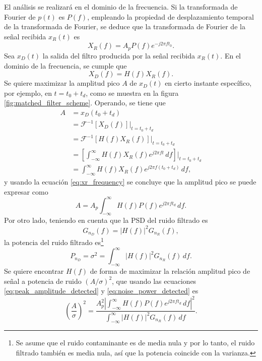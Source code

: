 \documentclass[a4paper]{article}
\begin{document}
El análisis se realizará en el dominio de la frecuencia. Si la transformada de Fourier de \(p(t)\) es \(P(f)\), empleando la propiedad de desplazamiento temporal de la transformada de Fourier, se deduce que la transformada de Fourier de la señal recibida \(x_R(t)\) es
\begin{equation}\label{eq:xr_frequency}
 X_R(f)=A_pP(f)e^{-j2\pi ft_0}.
\end{equation}
Sea \(x_D(t)\) la salida del filtro producida por la señal recibida \(x_R(t)\). En el dominio de la frecuencia, se cumple que
\[
 X_D(f)=H(f)X_R(f).
\]
Se quiere maximizar la amplitud pico \(A\) de \(x_D(t)\) en cierto instante específico, por ejemplo, en \(t=t_0+t_d\), como se muestra en la figura \ref{fig:matched_filter_scheme}. Operando, se tiene que
\begin{align*}
 A &= x_D(t_0+t_d)\\
    &=\mathcal{F}^{-1}\left[X_D(f)\right]\Big|_{t=t_0+t_d}\\
    &=\mathcal{F}^{-1}\left[H(f)X_R(f)\right]\Big|_{t=t_0+t_d}\\
    &=\left[\int_{-\infty}^{\infty}H(f)X_R(f)e^{j2\pi ft}\,df\right]\bigg|_{t=t_0+t_d}\\
    &=\int_{-\infty}^{\infty}H(f)X_R(f)e^{j2\pi f(t_0+t_d)}\,df,
\end{align*}
y usando la ecuación \ref{eq:xr_frequency} se concluye que la amplitud pico se puede expresar como
\begin{equation}\label{eq:peak_amplitude_detected}
 A=A_p\int_{-\infty}^{\infty}H(f)P(f)e^{j2\pi ft_d}\,df.
\end{equation}
Por otro lado, teniendo en cuenta que la PSD del ruido filtrado es
\[
 G_{n_D}(f)=\left|H(f)\right|^2G_{n_R}(f),
\]
la potencia del ruido filtrado es\footnote{Se asume que el ruido contaminante es de media nula y por lo tanto, el ruido filtrado también es media nula, así que la potencia coincide con la varianza.}
\begin{equation}\label{eq:noise_power_detected}
 P_{n_D}=\sigma^2=\int_{-\infty}^{\infty}\left|H(f)\right|^2G_{n_R}(f)\,df.
\end{equation}
Se quiere encontrar \(H(f)\) de forma de maximizar la relación amplitud pico de señal a potencia de ruido \((A/\sigma)^2\), que usando las ecuaciones \ref{eq:peak_amplitude_detected} y \ref{eq:noise_power_detected} es 
\begin{equation}\label{eq:signal_peak_noise_relation_generic}
 \left(\frac{A}{\sigma}\right)^2=\frac{A_p^2\left|\displaystyle\int_{-\infty}^{\infty}H(f)P(f)e^{j2\pi ft_d}\,df\right|^2}{\displaystyle\int_{-\infty}^{\infty}\left|H(f)\right|^2G_{n_R}(f)\,df}.
\end{equation}
\end{document}
